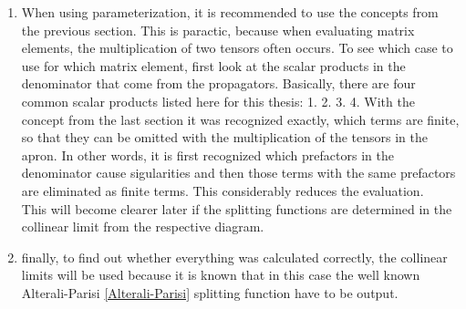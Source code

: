 \begin{enumerate}
\item When using parameterization, it is recommended to use the concepts from the previous section. This is paractic, because when evaluating matrix elements, the multiplication of two tensors often occurs. To see which case to use for which matrix element, first look at the scalar products in the denominator that come from the propagators. Basically, there are four common scalar products listed here for this thesis:
1.
2.
3.
4.
With the concept from the last section it was recognized exactly, which terms are finite, so that they can be omitted with the multiplication of the tensors in the apron. In other words, it is first recognized which prefactors in the denominator cause sigularities and then those terms with the same prefactors are eliminated as finite terms. This considerably reduces the evaluation.  
\\
This will become clearer later if the splitting functions are determined in the collinear limit from the respective diagram.
\item finally, to find out whether everything was calculated correctly, the collinear limits will be used because it is known that in this case the well known Alterali-Parisi \ref{Alterali-Parisi} splitting function have to be output.
\end{enumerate}
